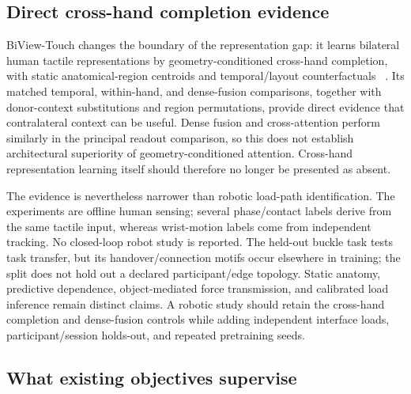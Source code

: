 \subsection{Direct cross-hand completion evidence}

BiView-Touch changes the boundary of the representation gap: it learns bilateral
human tactile representations by geometry-conditioned cross-hand completion,
with static anatomical-region centroids and temporal/layout counterfactuals
~\cite{liang2026biviewtouch}. Its matched temporal, within-hand, and dense-fusion
comparisons, together with donor-context substitutions and region permutations,
provide direct evidence that contralateral context can be useful. Dense fusion
and cross-attention perform similarly in the principal readout comparison, so
this does not establish architectural superiority of geometry-conditioned
attention. Cross-hand
representation learning itself should therefore no longer be presented as absent.

The evidence is nevertheless narrower than robotic load-path identification.
The experiments are offline human sensing; several phase/contact labels derive
from the same tactile input, whereas wrist-motion labels come from independent
tracking. No closed-loop robot study is reported. The held-out buckle task tests
task transfer, but its handover/connection motifs occur elsewhere in training;
the split does not hold out a declared participant/edge topology. Static anatomy,
predictive dependence, object-mediated force transmission, and calibrated load
inference remain distinct claims. A robotic study should retain the cross-hand
completion and dense-fusion controls while adding independent interface loads,
participant/session holds-out, and repeated pretraining seeds.

\subsection{What existing objectives supervise}

